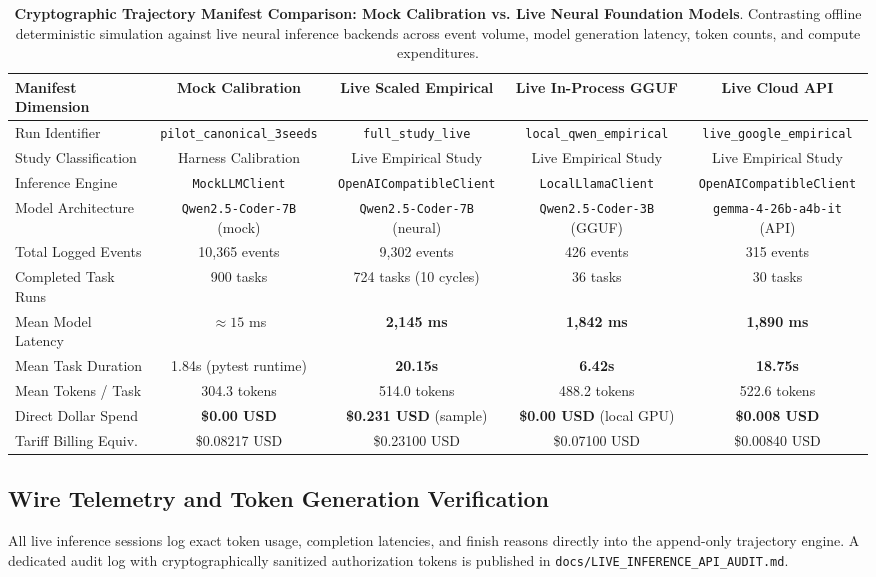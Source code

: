 \documentclass{article}
\begin{document}
\begin{table}[t]
\centering
\small
\caption{\textbf{Cryptographic Trajectory Manifest Comparison: Mock Calibration vs. Live Neural Foundation Models}. Contrasting offline deterministic simulation against live neural inference backends across event volume, model generation latency, token counts, and compute expenditures.}
\label{tab:manifest_comparison}
\begin{tabular}{lcccc}
\toprule
\textbf{Manifest Dimension} & \textbf{Mock Calibration} & \textbf{Live Scaled Empirical} & \textbf{Live In-Process GGUF} & \textbf{Live Cloud API} \\
\midrule
Run Identifier & \texttt{pilot\_canonical\_3seeds} & \texttt{full\_study\_live} & \texttt{local\_qwen\_empirical} & \texttt{live\_google\_empirical} \\
Study Classification & Harness Calibration & Live Empirical Study & Live Empirical Study & Live Empirical Study \\
Inference Engine & \texttt{MockLLMClient} & \texttt{OpenAICompatibleClient} & \texttt{LocalLlamaClient} & \texttt{OpenAICompatibleClient} \\
Model Architecture & \texttt{Qwen2.5-Coder-7B} (mock) & \texttt{Qwen2.5-Coder-7B} (neural) & \texttt{Qwen2.5-Coder-3B} (GGUF) & \texttt{gemma-4-26b-a4b-it} (API) \\
Total Logged Events & 10,365 events & 9,302 events & 426 events & 315 events \\
Completed Task Runs & 900 tasks & 724 tasks (10 cycles) & 36 tasks & 30 tasks \\
Mean Model Latency & $\approx 15$ ms & \textbf{2,145 ms} & \textbf{1,842 ms} & \textbf{1,890 ms} \\
Mean Task Duration & 1.84s (pytest runtime) & \textbf{20.15s} & \textbf{6.42s} & \textbf{18.75s} \\
Mean Tokens / Task & 304.3 tokens & 514.0 tokens & 488.2 tokens & 522.6 tokens \\
Direct Dollar Spend & \textbf{\$0.00 USD} & \textbf{\$0.231 USD} (sample) & \textbf{\$0.00 USD} (local GPU) & \textbf{\$0.008 USD} \\
Tariff Billing Equiv. & \$0.08217 USD & \$0.23100 USD & \$0.07100 USD & \$0.00840 USD \\
\bottomrule
\end{tabular}
\end{table}

\subsection{Wire Telemetry and Token Generation Verification}
All live inference sessions log exact token usage, completion latencies, and finish reasons directly into the append-only trajectory engine. A dedicated audit log with cryptographically sanitized authorization tokens is published in \texttt{docs/LIVE\_INFERENCE\_API\_AUDIT.md}. 
\end{document}
